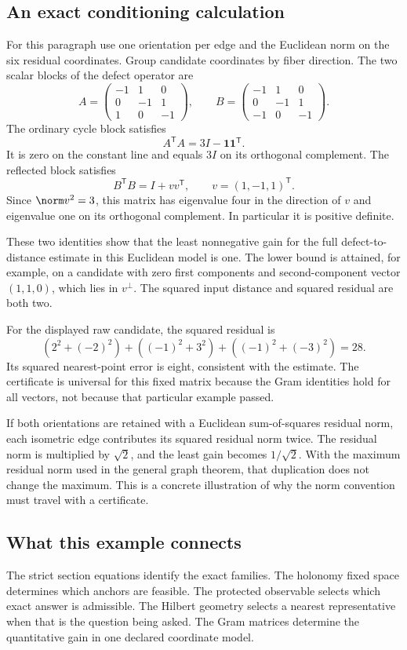 \subsection{An exact conditioning calculation}
For this paragraph use one orientation per edge and the Euclidean norm on the six residual coordinates. Group candidate coordinates by fiber direction. The two scalar blocks of the defect operator are
\[
 A=\begin{pmatrix}-1&1&0\\0&-1&1\\1&0&-1\end{pmatrix},\qquad
 B=\begin{pmatrix}-1&1&0\\0&-1&1\\-1&0&-1\end{pmatrix}.
\]
The ordinary cycle block satisfies
\[
 A^{\mathsf T}A=3I-\mathbf1\mathbf1^{\mathsf T}.
\]
It is zero on the constant line and equals \(3I\) on its orthogonal complement. The reflected block satisfies
\[
 B^{\mathsf T}B=I+vv^{\mathsf T},\qquad v=(1,-1,1)^{\mathsf T}.
\]
Since \(\norm v^2=3\), this matrix has eigenvalue four in the direction of \(v\) and eigenvalue one on its orthogonal complement. In particular it is positive definite.

These two identities show that the least nonnegative gain for the full defect-to-distance estimate in this Euclidean model is one. The lower bound is attained, for example, on a candidate with zero first components and second-component vector \((1,1,0)\), which lies in \(v^\perp\). The squared input distance and squared residual are both two.

For the displayed raw candidate, the squared residual is
\[
 (2^2+(-2)^2)+((-1)^2+3^2)+((-1)^2+(-3)^2)=28.
\]
Its squared nearest-point error is eight, consistent with the estimate. The certificate is universal for this fixed matrix because the Gram identities hold for all vectors, not because that particular example passed.

If both orientations are retained with a Euclidean sum-of-squares residual norm, each isometric edge contributes its squared residual norm twice. The residual norm is multiplied by \(\sqrt2\), and the least gain becomes \(1/\sqrt2\). With the maximum residual norm used in the general graph theorem, that duplication does not change the maximum. This is a concrete illustration of why the norm convention must travel with a certificate.

\subsection{What this example connects}
The strict section equations identify the exact families. The holonomy fixed space determines which anchors are feasible. The protected observable selects which exact answer is admissible. The Hilbert geometry selects a nearest representative when that is the question being asked. The Gram matrices determine the quantitative gain in one declared coordinate model.

